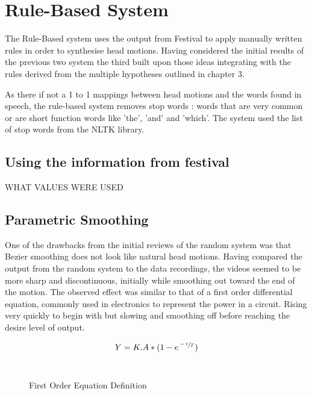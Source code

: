 \documentclass[bsc,frontabs,twoside,singlespacing,parskip]{infthesis}
\begin{document}
\section{Rule-Based System}

The Rule-Based system uses the output from Festival to apply manually written rules in order to synthesise head motions. Having considered the initial results of the previous two system the third built upon those ideas integrating with the rules derived from the multiple hypotheses outlined in chapter 3.

As there if not a 1 to 1 mappings between head motions and the words found in speech, the rule-based system removes stop words : words that are very common or are short function words like 'the', 'and' and 'which'. The system used the list of stop words from the NLTK library.

\subsection{Using the information from festival}

WHAT VALUES WERE USED

\subsection{Parametric Smoothing}

One of the drawbacks from the initial reviews of the random system was that Bezier smoothing does not look like natural head motions. Having compared the output from the random system to the data recordings, the videos seemed to be more sharp and discontinuous, initially while smoothing out toward the end of the motion. The observed effect was similar to that of a first order differential equation, commonly used in electronics to represent the power in a circuit. Rising very quickly to begin with but slowing and smoothing off before reaching the desire level of output. 

\begin{figure}
	\centering
	$$ Y = K.A * (1 - e^{\sfrac{-t}{T}})$$
	\\
	
	\caption{First Order Equation Definition} 
\end{figure}
\end{document}
